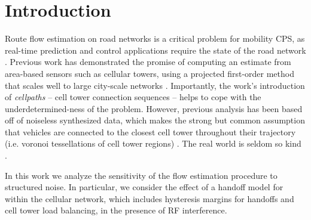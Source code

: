 
\section{Introduction}
Route flow estimation on road networks is a critical problem for mobility CPS, as real-time prediction and control applications require the state of the road network \cite{Faouzi2011,Mathew2014}. Previous work has demonstrated the promise of computing an estimate from area-based sensors such as cellular towers, using a projected first-order method that scales well to large city-scale networks \cite{Wu2015}. Importantly, the work's introduction of \textit{cellpaths} -- cell tower connection sequences -- helps to cope with the underdetermined-ness of the problem. However, previous analysis has been based off of noiseless synthesized data, which makes the strong but common assumption that vehicles are connected to the closest cell tower throughout their trajectory (i.e. voronoi tessellations of cell tower regions) \cite{Voronoi1908}. The real world is seldom so kind \cite{Caceres2013}.

In this work we analyze the sensitivity of the flow estimation procedure to structured noise. In particular, we consider the effect of a handoff model for within the cellular network, which includes hysteresis margins for handoffs and cell tower load balancing, in the presence of RF interference.
